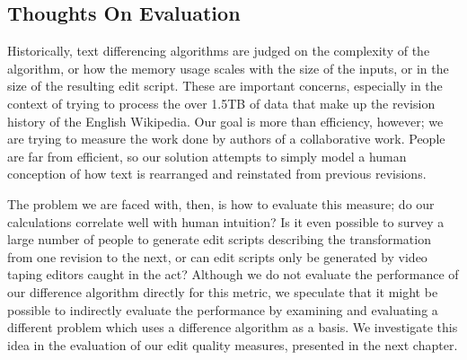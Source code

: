 \subsection{Thoughts On Evaluation}

Historically, text differencing algorithms are judged
on the complexity of the algorithm, or how the memory
usage scales with the size of the inputs, or in the
size of the resulting edit script.
These are important concerns, especially in the context of
trying to process the over 1.5TB of data that make up the
revision history of the English Wikipedia.
Our goal is more than efficiency, however; we are trying
to measure the work done by authors of a collaborative work.
People are far from efficient, so our solution attempts to
simply model a human conception of how text is rearranged
and reinstated from previous revisions.

The problem we are faced with, then, is how to evaluate
this measure; do our calculations correlate well with
human intuition?
Is it even possible to survey a large number of people
to generate edit scripts describing the transformation from
one revision to the next, or can edit scripts only be generated
by video taping editors caught in the act?
Although we do not evaluate the performance of our difference
algorithm directly for this metric, we speculate that it might be
possible to indirectly evaluate the performance by examining and
evaluating a different problem which uses a difference algorithm as a basis.
We investigate this idea in the evaluation of our edit quality
measures, presented in the next chapter.

